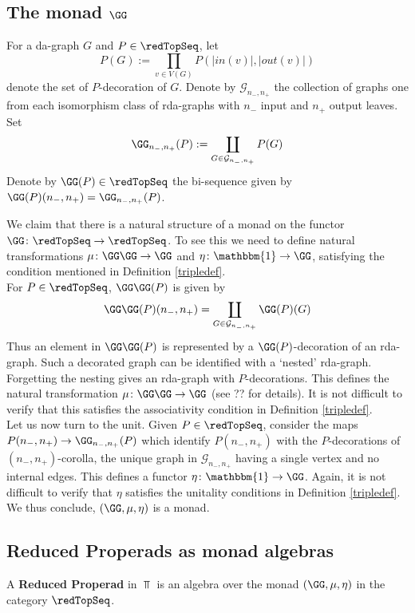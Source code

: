\documentclass[a4paper,10pt]{amsart}
\begin{document}

\subsection{The monad $\GG$}\label{GGtripsubsec}
For a da-graph $G$ and $P \in \redTopSeq$, let 
\[ P(G) := \prod_{v \in V(G)} P(|in(v)|,|out(v)|) \]
denote the set of $P$-decoration of $G$. Denote by $\mathcal{G}_{n_-,n_+}$ the collection of graphs one from each isomorphism class of rda-graphs with $n_-$ input and $n_+$ output leaves. Set 
\[ \GG_{n_-,n_+}(P) := \coprod_{G \in \mathcal{G}_{n_-,n_+}}P(G)\]
Denote by $\GG(P) \in \redTopSeq$ the bi-sequence given by $\GG(P) (n_-,n_+) = \GG_{n_-,n_+}(P)$. 


We claim that there is a natural structure of a monad on the functor $\GG \colon \redTopSeq \to \redTopSeq$. To see this we need to define natural transformations $\mu \colon \GG \GG \to \GG$ and $\eta \colon \mathbbm{1} \to \GG$, satisfying the condition mentioned in Definition	 \ref{tripledef}.\\
For $P \in \redTopSeq$, $\GG\GG(P)$ is given by
\[ \GG\GG(P)(n_-,n_+) = \coprod_{G\in \mathcal{G}_{n_-,n_+}} \GG(P) (G) \]
Thus an element in $\GG\GG(P)$ is represented by a $\GG(P)$-decoration of an rda-graph. Such a decorated graph can be identified with a `nested' rda-graph. Forgetting the nesting gives an rda-graph with $P$-decorations. This defines the natural transformation $\mu \colon \GG\GG \to \GG$ (see ?? for details). It is not difficult to verify that this satisfies the associativity condition in Definition \ref{tripledef}.\\
Let us now turn to the unit. Given $P \in \redTopSeq$, consider the maps $P(n_-,n_+) \to \GG_{n_-,n_+}(P)$ which identify $P(n_-,n_+)$ with the $P$-decorations of $(n_-,n_+)$-corolla, the unique graph in $\mathcal{G}_{n_-,n_+}$ having a single vertex and no internal edges. This defines a functor $\eta \colon \mathbbm{1} \to \GG$. Again, it is not difficult to verify that $\eta$ satisfies the unitality conditions in Definition \ref{tripledef}.\\
We thus conclude, $(\GG,\mu,\eta)$ is a monad.



\subsection{Reduced Properads as monad algebras}
\begin{definition}
	A \textbf{Reduced Properad} in $\Top$ is an algebra over the monad $(\GG, \mu, \eta)$ in the category $\redTopSeq$.
\end{definition}
\end{document}
